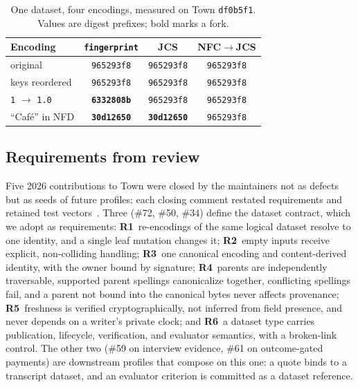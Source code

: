 \documentclass[conference]{IEEEtran}
\begin{document}
\begin{table}[t]
\caption{One dataset, four encodings, measured on Town \texttt{df0b5f1}. Values are digest prefixes; bold marks a fork.}
\label{tab:forks}
\centering\small
\setlength{\tabcolsep}{3pt}
\begin{tabular}{l|c|c|c}
\hline
Encoding & \texttt{fingerprint} & JCS & NFC$\rightarrow$JCS \\
\hline
original & \texttt{965293f8} & \texttt{965293f8} & \texttt{965293f8}\\
keys reordered & \texttt{965293f8} & \texttt{965293f8} & \texttt{965293f8}\\
\texttt{1} $\rightarrow$ \texttt{1.0} & \textbf{\texttt{6332808b}} & \texttt{965293f8} & \texttt{965293f8}\\
``Caf\'e'' in NFD & \textbf{\texttt{30d12650}} & \textbf{\texttt{30d12650}} & \texttt{965293f8}\\
\hline
\end{tabular}
\end{table}

\subsection{Requirements from review}
Five 2026 contributions to Town were closed by the maintainers not as defects but as seeds of future profiles; each closing comment restated requirements and retained test vectors~\cite{pr72,pr50,pr34,pr59,pr61}. Three (\#72, \#50, \#34) define the dataset contract, which we adopt as requirements:
\textbf{R1}~re-encodings of the same logical dataset resolve to one identity, and a single leaf mutation changes it;
\textbf{R2}~empty inputs receive explicit, non-colliding handling;
\textbf{R3}~one canonical encoding and content-derived identity, with the owner bound by signature;
\textbf{R4}~parents are independently traversable, supported parent spellings canonicalize together, conflicting spellings fail, and a parent not bound into the canonical bytes never affects provenance;
\textbf{R5}~freshness is verified cryptographically, not inferred from field presence, and never depends on a writer's private clock; and
\textbf{R6}~a dataset type carries publication, lifecycle, verification, and evaluator semantics, with a broken-link control.
The other two (\#59 on interview evidence, \#61 on outcome-gated payments) are downstream profiles that compose on this one: a quote binds to a transcript dataset, and an evaluator criterion is committed as a dataset reference.
\end{document}
